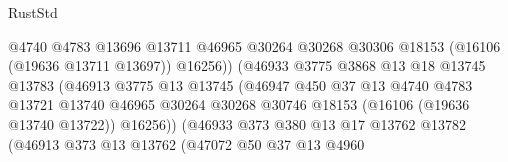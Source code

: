 \begin{lexlean}{RustStd}
\begin{coremodule}
                                          @4740
                                          @4783
                                          @13696
                                          @13711
                                          @46965
                                          @30264
                                          @30268
                                          @30306
                                          @18153
                                          (@16106 (@19636 @13711 @13697))
                                          @16256))
                                      (@46933
                                        @3775
                                        @3868
                                        @13
                                        @18
                                        @13745
                                        @13783
                                        (@46913
                                          @3775
                                          @13
                                          @13745
                                          (@46947
                                            @450
                                            @37
                                            @13
                                            @4740
                                            @4783
                                            @13721
                                            @13740
                                            @46965
                                            @30264
                                            @30268
                                            @30746
                                            @18153
                                            (@16106 (@19636 @13740 @13722))
                                            @16256))
                                        (@46933
                                          @373
                                          @380
                                          @13
                                          @17
                                          @13762
                                          @13782
                                          (@46913
                                            @373
                                            @13
                                            @13762
                                            (@47072
                                              @50
                                              @37
                                              @13
                                              @4960

\end{coremodule}
\end{lexlean}

